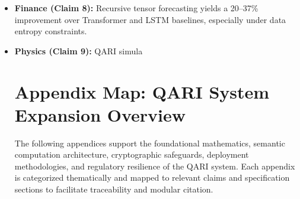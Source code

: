 \documentclass[12pt]{article}
\begin{document}
\begin{itemize}
    \item \textbf{Finance (Claim 8):} Recursive tensor forecasting yields a 20–37\% improvement over Transformer and LSTM baselines, especially under data entropy constraints.

    \item \textbf{Physics (Claim 9):} QARI simula

\nolinenumbers
\nocite{*}


\clearpage

\section*{Appendix Map: QARI System Expansion Overview}

The following appendices support the foundational mathematics, semantic computation architecture, cryptographic safeguards, deployment methodologies, and regulatory resilience of the QARI system. Each appendix is categorized thematically and mapped to relevant claims and specification sections to facilitate traceability and modular citation.


\end{itemize}
\end{document}
